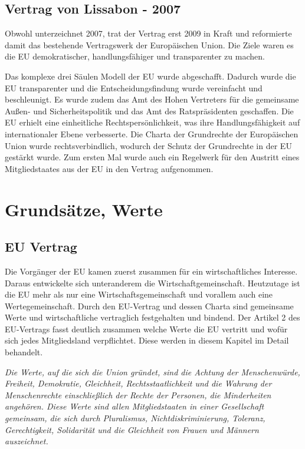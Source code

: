 \documentclass[12pt, oneside]{book} %
\begin{document}
\section{Vertrag von Lissabon - 2007}
Obwohl unterzeichnet 2007, trat der Vertrag erst 2009 in Kraft und reformierte damit das bestehende Vertragswerk der Europäischen Union. Die Ziele waren es die EU demokratischer, handlungsfähiger und transparenter zu machen. 

Das komplexe drei Säulen Modell der EU wurde abgeschafft. Dadurch wurde die EU transparenter und die Entscheidungsfindung wurde vereinfacht und beschleunigt.
Es wurde zudem das Amt des Hohen Vertreters für die gemeinsame Außen- und Sicherheitspolitik und das Amt des Ratspräsidenten geschaffen. Die EU erhielt eine einheitliche Rechtspersönlichkeit, was ihre Handlungsfähigkeit auf internationaler Ebene verbesserte. Die Charta der Grundrechte der Europäischen Union wurde rechtsverbindlich, wodurch der Schutz der Grundrechte in der EU gestärkt wurde. Zum ersten Mal wurde auch ein Regelwerk für den Austritt eines Mitgliedstaates aus der EU in den Vertrag aufgenommen.


\chapter{Grundsätze, Werte}
\section{EU Vertrag}
Die Vorgänger der EU kamen zuerst zusammen für ein wirtschaftliches Interesse. Daraus entwickelte sich unteranderem die Wirtschaftgemeinschaft. Heutzutage ist die EU mehr als nur eine Wirtschaftsgemeinschaft und vorallem auch eine Wertegemeinschaft. Durch den EU-Vertrag und dessen Charta sind gemeinsame Werte und wirtschaftliche vertraglich festgehalten und bindend.
Der Artikel 2 des EU-Vertrags fasst deutlich zusammen welche Werte die EU vertritt und wofür sich jedes Mitgliedsland verpflichtet\parencite[]{eu-vertag}. Diese werden in diesem Kapitel im Detail behandelt.

\textit{Die Werte, auf die sich die Union gründet, sind die Achtung der Menschenwürde, Freiheit, Demokratie,
Gleichheit, Rechtsstaatlichkeit und die Wahrung der Menschenrechte einschließlich der Rechte
der Personen, die Minderheiten angehören. Diese Werte sind allen Mitgliedstaaten in einer Gesellschaft
gemeinsam, die sich durch Pluralismus, Nichtdiskriminierung, Toleranz, Gerechtigkeit, Solidarität
und die Gleichheit von Frauen und Männern auszeichnet.}
\end{document}

